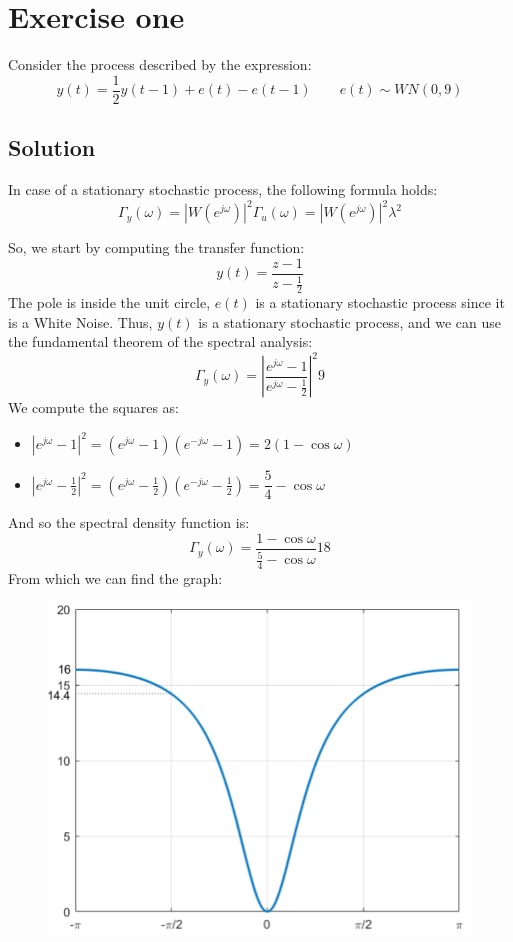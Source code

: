 \section{Exercise one}

Consider the process described by the expression: 
\[y(t)=\dfrac{1}{2}y(t-1)+e(t)-e(t-1) \qquad e(t) \sim WN(0,9)\]

\subsection{Solution}
In case of a stationary stochastic process, the following formula holds: 
\[\Gamma_y(\omega)=\left\lvert W(e^{j\omega})\right\rvert^2 \Gamma_u(\omega) = \left\lvert W(e^{j\omega})\right\rvert^2 \lambda^2\]

So, we start by computing the transfer function: 
\[y(t)=\dfrac{z-1}{z-\frac{1}{2}}\]
The pole is inside the unit circle, $e(t)$ is a stationary stochastic process since it is a White Noise. 
Thus, $y(t)$ is a stationary stochastic process, and we can use the fundamental theorem of the spectral analysis: 
\[\Gamma_y(\omega) = \left\lvert \dfrac{e^{j\omega}-1}{e^{j\omega}-\frac{1}{2}}\right\rvert^2 9\]
We compute the squares as: 
\begin{itemize}
    \item $\left\lvert e^{j\omega}-1 \right\rvert^2=\left( e^{j\omega}-1 \right)\left( e^{-j\omega}-1 \right)=2(1-\cos\omega)$
    \item $\left\lvert e^{j\omega}-\frac{1}{2}\right\rvert^2=\left( e^{j\omega}-\frac{1}{2} \right)\left( e^{-j\omega}-\frac{1}{2} \right)=\dfrac{5}{4}-\cos\omega$
\end{itemize}
And so the spectral density function is: 
\[\Gamma_y(\omega) = \dfrac{1-\cos\omega}{\frac{5}{4}-\cos\omega} 18\]
From which we can find the graph: 
\begin{figure}[H]
    \centering
    \includegraphics[width=0.5\linewidth]{images/spec.png}
\end{figure}